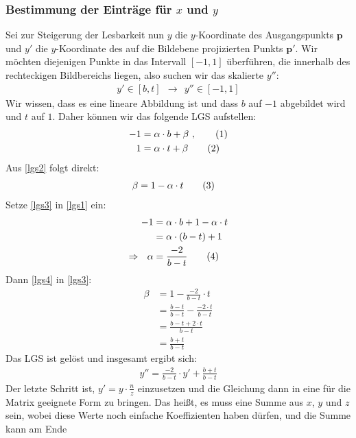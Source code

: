 \documentclass[a4paper,parskip=full*]{scrartcl}
\newcommand{\bvec}[1]{\ensuremath{\mathbf{#1}}}
\newcommand\numberthis{\addtocounter{equation}{1}\tag{\theequation}}
\begin{document}
\subsubsection{Bestimmung der Einträge für $x$ und $y$}
Sei zur Steigerung der Lesbarkeit nun $y$ die $y$-Koordinate des
Ausgangspunkts $\bvec{p}$ und $y'$ die $y$-Koordinate des auf die
Bildebene projizierten Punkts $\bvec{p}'$. Wir möchten diejenigen Punkte
in das Intervall $[-1, 1]$ überführen, die innerhalb des rechteckigen
Bildbereichs liegen, also suchen wir das skalierte $y''$:
\begin{align*}
	y' \in [b, t]  ~~  \rightarrow  ~~  y'' \in [-1, 1]
\end{align*}
Wir wissen, dass es eine lineare Abbildung ist und dass $b$ auf $-1$
abgebildet wird und $t$ auf $1$. Daher können wir das folgende LGS
aufstellen:
\begin{align*}
	-1 &= \alpha \cdot b + \beta ~ , \numberthis\label{lgs1} \\
	 1 &= \alpha \cdot t + \beta  \numberthis\label{lgs2}
\end{align*}
Aus \eqref{lgs2} folgt direkt:
\begin{align*}
	\beta &= 1 - \alpha \cdot t  \numberthis\label{lgs3}
\end{align*}
Setze \eqref{lgs3} in \eqref{lgs1} ein:
\begin{align*}
	-1 &= \alpha \cdot b + 1 - \alpha \cdot t  \\
	   &= \alpha \cdot (b - t) + 1  \\
	\Rightarrow ~~ \alpha &= \frac{-2}{b - t}  \numberthis\label{lgs4}
\end{align*}
Dann \eqref{lgs4} in \eqref{lgs3}:
\begin{align*}
	\beta &= 1 - \frac{-2}{b - t} \cdot t  \\
	      &= \frac{b - t}{b - t} - \frac{-2 \cdot t}{b - t}  \\
	      &= \frac{b - t + 2 \cdot t}{b - t}  \\
	      &= \frac{b + t}{b - t}
\end{align*}
Das LGS ist gelöst und insgesamt ergibt sich:
\begin{align*}
	y'' = \frac{-2}{b - t} \cdot y' + \frac{b + t}{b - t}
\end{align*}
Der letzte Schritt ist, $y' = y \cdot \frac{n}{z}$ einzusetzen und die
Gleichung dann in eine für die Matrix geeignete Form zu bringen. Das
heißt, es muss eine Summe aus $x$, $y$ und $z$ sein, wobei diese Werte
noch einfache Koeffizienten haben dürfen, und die Summe kann am Ende
\end{document}
